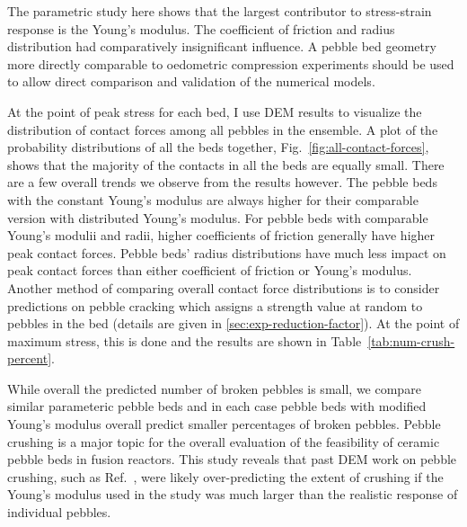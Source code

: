 The parametric study here shows that the largest contributor to stress-strain response is the Young’s modulus. The coefficient of friction and radius distribution had comparatively insignificant influence. A pebble bed geometry more directly comparable to oedometric compression experiments should be used to allow direct comparison and validation of the numerical models.


At the point of peak stress for each bed, I use DEM results to visualize the distribution of contact forces among all pebbles in the ensemble. A plot of the probability distributions of all the beds together, Fig.~\ref{fig:all-contact-forces}, shows that the majority of the contacts in all the beds are equally small. There are a few overall trends we observe from the results however. The pebble beds with the constant Young's modulus are always higher for their comparable version with distributed Young's modulus. For pebble beds with comparable Young's modulii and radii, higher coefficients of friction generally have higher peak contact forces. Pebble beds' radius distributions have much less impact on peak contact forces than either coefficient of friction or Young’s modulus. Another method of comparing overall contact force distributions is to consider predictions on pebble cracking which assigns a strength value at random to pebbles in the bed (details are given in \cref{sec:exp-reduction-factor}). At the point of maximum stress, this is done and the results are shown in Table~\ref{tab:num-crush-percent}.

While overall the predicted number of broken pebbles is small, we compare similar parameteric pebble beds and in each case pebble beds with modified Young’s modulus overall predict smaller percentages of broken pebbles. Pebble crushing is a major topic for the overall evaluation of the feasibility of ceramic pebble beds in fusion reactors. This study reveals that past DEM work on pebble crushing, such as Ref.~\cite{Annabattula2012a,Annabattula2014,Zhao2013}, were likely over-predicting the extent of crushing if the Young's modulus used in the study was much larger than the realistic response of individual pebbles.

